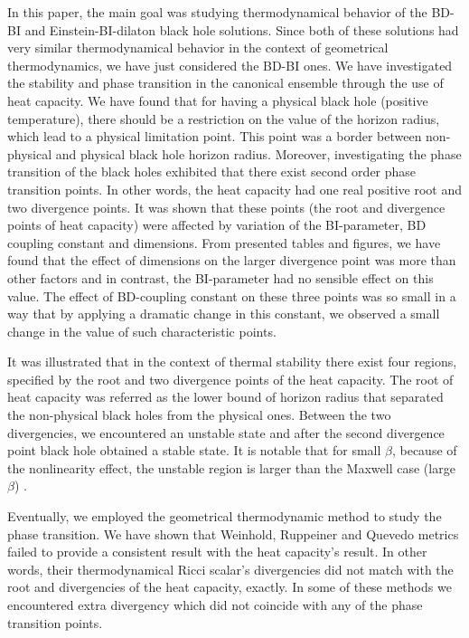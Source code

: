 \documentclass[aps,onecolumn ]{revtex4}
\begin{document}
In this paper, the main goal was studying thermodynamical behavior
of the BD-BI and Einstein-BI-dilaton black hole solutions. Since
both of these solutions had very similar thermodynamical behavior
in the context of geometrical thermodynamics, we have just
considered the BD-BI ones. We have investigated the stability and
phase transition in the canonical ensemble through the use of heat
capacity. We have found that for having a physical black hole
(positive temperature), there should be a restriction on the value
of the horizon radius, which lead to a physical limitation point.
This point was a border between non-physical and physical black
hole horizon radius. Moreover, investigating the phase transition
of the black holes exhibited that there exist second order phase
transition points. In other words, the heat capacity had one real
positive root and two divergence points. It was shown that these
points (the root and divergence points of heat capacity) were
affected by variation of the BI-parameter, BD coupling constant
and dimensions. From presented tables and figures, we have found
that the effect of dimensions on the larger divergence point was
more than other factors and in contrast, the BI-parameter had no
sensible effect on this value. The effect of BD-coupling constant
on these three points was so small in a way that by applying a
dramatic change in this constant, we observed a small change in
the value of such characteristic points.

It was illustrated that in the context of thermal stability there
exist four regions, specified by the root and two divergence
points of the heat capacity. The root of heat capacity was
referred as the lower bound of horizon radius that separated the
non-physical black holes from the physical ones. Between the two
divergencies, we encountered an unstable state and after the
second divergence point black hole obtained a stable state. It is
notable that for small $\beta$, because of the nonlinearity
effect, the unstable region is larger than the Maxwell case (large
$\beta$) \cite{BD-Max}.

Eventually, we employed the geometrical thermodynamic method to
study the phase transition. We have shown that Weinhold, Ruppeiner
and Quevedo metrics failed to provide a consistent result with the
heat capacity's result. In other words, their thermodynamical
Ricci scalar's divergencies did not match with the root and
divergencies of the heat capacity, exactly. In some of these
methods we encountered extra divergency which did not coincide
with any of the phase transition points.
\end{document}
